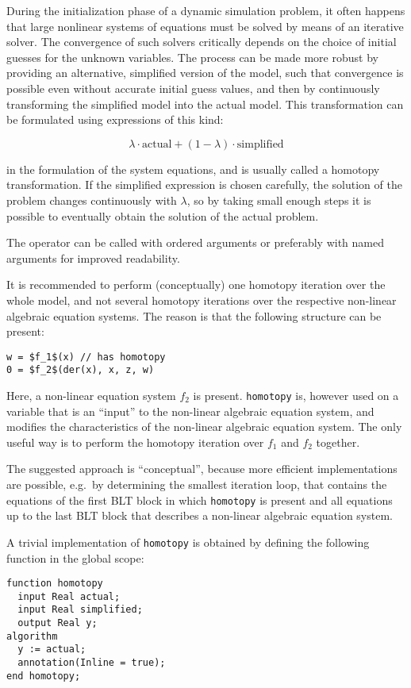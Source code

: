 \begin{nonnormative}
During the initialization phase of a dynamic simulation
problem, it often happens that large nonlinear systems of equations must
be solved by means of an iterative solver. The convergence of such
solvers critically depends on the choice of initial guesses for the
unknown variables. The process can be made more robust by providing an
alternative, simplified version of the model, such that convergence is
possible even without accurate initial guess values, and then by
continuously transforming the simplified model into the actual model.
This transformation can be formulated using expressions of this kind:

$$\lambda\cdot\text{actual} + (1-\lambda)\cdot\text{simplified}$$

in the formulation of the system equations, and is usually called
a homotopy transformation. If the simplified expression is chosen
carefully, the solution of the problem changes continuously with $\lambda$,
so by taking small enough steps it is possible to eventually obtain the
solution of the actual problem.

The operator can be called with ordered arguments or preferably
with named arguments for improved readability.

It is recommended to perform (conceptually) one homotopy iteration
over the whole model, and not several homotopy iterations over the
respective non-linear algebraic equation systems. The reason is that the
following structure can be present:
\begin{lstlisting}[language=modelica]
w = $f_1$(x) // has homotopy
0 = $f_2$(der(x), x, z, w)
\end{lstlisting}

Here, a non-linear equation system $f_2$
is present. \lstinline!homotopy! is, however used on a variable
that is an ``input'' to the non-linear algebraic equation system, and
modifies the characteristics of the non-linear algebraic equation
system. The only useful way is to perform the homotopy iteration over
$f_1$ and $f_2$ together.

The suggested approach is ``conceptual'', because more efficient
implementations are possible, e.g.\ by determining the smallest iteration
loop, that contains the equations of the first BLT block in which
\lstinline!homotopy! is present and all equations up to the last BLT block
that describes a non-linear algebraic equation system.

A trivial implementation of \lstinline!homotopy! is obtained by
defining the following function in the global scope:
\begin{lstlisting}[language=modelica]
function homotopy
  input Real actual;
  input Real simplified;
  output Real y;
algorithm
  y := actual;
  annotation(Inline = true);
end homotopy;
\end{lstlisting}
\end{nonnormative}

